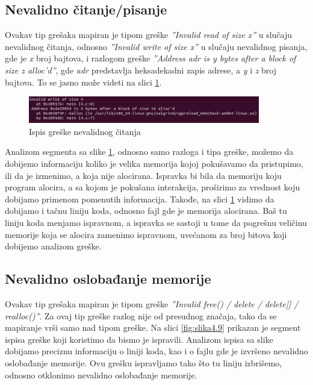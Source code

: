 \documentclass[12pt,oneside]{memoir}
\theoremstyle{plain}
\theoremstyle{definition}
\begin{document}
\subsection{Nevalidno čitanje/pisanje}
Ovakav tip grešaka mapiran je tipom greške \textit{''Invalid read of size x''} u slučaju nevalidnog čitanja, odnosno \textit{''Invalid write of size x''} u slučaju nevalidnog pisanja, gde je \textit{x} broj bajtova, i razlogom greške \textit{''Address adr is y bytes after a block of size z alloc'd''}, gde \textit{adr} predstavlja heksadekadni zapis adrese, a \textit{y} i \textit{z} broj bajtova. To se jasno može videti na slici \ref{fig:slika4.8}.

\begin{figure}[!ht]
  \centering
  \includegraphics[width=0.9\textwidth]{InvalidReadErrorExample.png}
  \caption{Ispis greške nevalidnog čitanja}
  \label{fig:slika4.8}
\end{figure} 

Analizom segmenta sa slike \ref{fig:slika4.8}, odnosno samo razloga i tipa greške, možemo da dobijemo informaciju koliko je velika memorija kojoj pokušavamo da pristupimo, ili da je izmenimo, a koja nije alocirana. Ispravka bi bila da memoriju koju program alocira, a sa kojom je pokušana interakcija, proširimo za vrednost koju dobijamo primenom pomenutih informacija. Takođe, na slici \ref{fig:slika4.8} vidimo da dobijamo i tačnu liniju koda, odnosno fajl gde je memorija alocirana. Baš tu liniju koda menjamo ispravnom, a ispravka se sastoji u tome da pogrešnu veličinu memorije koja se alocira zamenimo ispravnom, uvećanom za broj bitova koji dobijemo analizom greške. 

\subsection{Nevalidno oslobađanje memorije}
Ovakav tip grešaka mapiran je tipom greške \textit{''Invalid free() / delete / delete[] / realloc()''}. Za ovaj tip greške razlog nije od presudnog značaja, tako da se mapiranje vrši samo nad tipom greške. Na slici \ref{fig:slika4.9} prikazan je segment ispisa greške koji koristimo da bismo je ispravili. Analizom ispisa sa slike dobijamo preciznu informaciju o liniji koda, kao i o fajlu gde je izvršeno nevalidno oslobađanje memorije. Ovu grešku ispravljamo tako što tu liniju izbrišemo, odnosno otklonimo nevalidno oslobađanje memorije. 
\end{document}
